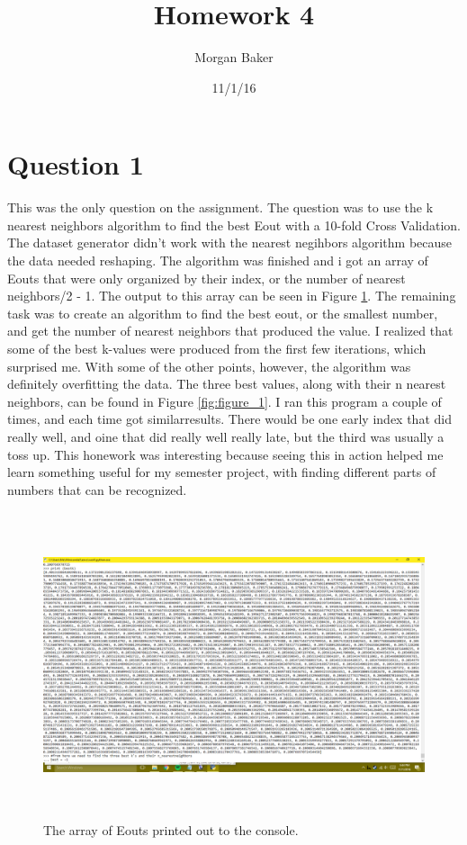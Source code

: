 \documentclass[a4paper]{article}
\title{Homework 4}
\author{Morgan Baker}
\date{11/1/16}
\begin{document}
\lstset{language=Python}

\maketitle

\section{Question 1}
This was the only question on the assignment. The question was to use the k nearest neighbors algorithm to find the best Eout with a 10-fold Cross Validation. The dataset generator didn't work with the nearest negihbors algorithm because the data needed reshaping. The algorithm was finished and i got an array of Eouts that were only organized by their index, or the number of nearest neighbors/2 - 1. The output to this array can be seen in Figure \ref{fig:figure_3}. The remaining task was to create an algorithm to find the best eout, or the smallest number, and get the number of nearest neighbors that produced the value. I realized that some of the best k-values were produced from the first few iterations, which surprised me. With some of the other points, however, the algorithm  was definitely overfitting the data. The three best values, along with their n nearest neighbors, can be found in Figure \ref{fig:figure_1}. I ran this program a couple of times, and each time got similarresults. There would be one early index that did really well, and oine that did really well really late, but the third was usually a toss up. This honework was interesting because seeing this in action helped me learn something useful for my semester project, with finding different parts of numbers that can be recognized.
\begin{figure}
  \includegraphics[width=\linewidth, height=9cm]{Eouts.png}
  \caption{The array of Eouts printed out to the console.}
  \label{fig:figure_3}
\end{figure}
\end{document}
